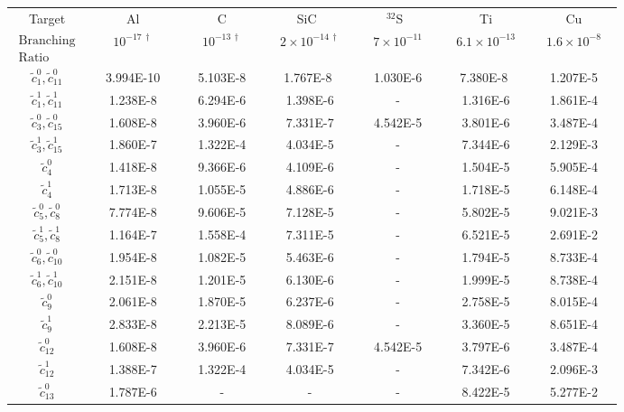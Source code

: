 \documentclass{book}[letterpaper,12pt]
\begin{document}
\begin{table}
\centering
{\renewcommand{\arraystretch}{1.5}
\begin{tabular}{ccccccc}
\hline
\hline
Target  &~~~~Al~~~~&~~~~C~~~~&~~~SiC~~~~&~~~$^{32}$S~~~~&~~~~Ti~~~~&~~~~Cu~~~~ \\[1.6pt]
$\begin{array}{l} \mathrm{Branching} \\  \mathrm{Ratio} \end{array}$ & $10^{-17 \, \dagger}$ & $10^{-13 \, \dagger}$ & $2 \times 10^{-14 \, \dagger}$ & $7 \times 10^{-11}$ &  $6.1 \times 10^{-13}$ & $1.6 \times 10^{-8}$  \\
\hline
$\tilde{c}_1^0,\tilde{c}_{11}^0$ &~~3.994E-10~~ & ~~5.103E-8~~ & ~~1.767E-8 ~~& ~~1.030E-6~~ & ~~7.380E-8 ~~& ~~1.207E-5~~ \\
$\tilde{c}_1^1,\tilde{c}_{11}^1$ &1.238E-8 & 6.294E-6 & 1.398E-6 & - & 1.316E-6 & 1.861E-4 \\
$\tilde{c}_3^0,\tilde{c}_{15}^0$ &1.608E-8 & 3.960E-6 &7.331E-7 & 4.542E-5 & 3.801E-6 & 3.487E-4 \\
$\tilde{c}_3^1,\tilde{c}_{15}^1$ &1.860E-7 & 1.322E-4 & 4.034E-5 & - & 7.344E-6 & 2.129E-3 \\
$\tilde{c}_4^0$ & 1.418E-8 & 9.366E-6 & 4.109E-6 & - & 1.504E-5 & 5.905E-4 \\
$\tilde{c}_4^1$ & 1.713E-8 & 1.055E-5 & 4.886E-6 & - & 1.718E-5 & 6.148E-4 \\
$\tilde{c}_5^0,\tilde{c}_8^0$ &7.774E-8 & 9.606E-5 & 7.128E-5 & - & 5.802E-5 & 9.021E-3 \\
$\tilde{c}_5^1,\tilde{c}_8^1$ &1.164E-7 & 1.558E-4 & 7.311E-5 & - & 6.521E-5 & 2.691E-2 \\
$\tilde{c}_6^0,\tilde{c}_{10}^0$ & 1.954E-8 & 1.082E-5 & 5.463E-6 & - & 1.794E-5 & 8.733E-4 \\
$\tilde{c}_6^1,\tilde{c}_{10}^1$ & 2.151E-8 & 1.201E-5 & 6.130E-6 & - & 1.999E-5 & 8.738E-4 \\
$\tilde{c}_9^0$ & 2.061E-8 & 1.870E-5 & 6.237E-6 & - & 2.758E-5 & 8.015E-4 \\
$\tilde{c}_9^1$ & 2.833E-8 & 2.213E-5 & 8.089E-6 & - & 3.360E-5 & 8.651E-4 \\
$\tilde{c}_{12}^0$ & 1.608E-8 & 3.960E-6 & 7.331E-7 & 4.542E-5 & 3.797E-6 & 3.487E-4 \\
$\tilde{c}_{12}^1$ & 1.388E-7 & 1.322E-4 & 4.034E-5 & - & 7.342E-6 & 2.096E-3 \\
$\tilde{c}_{13}^0$ & 1.787E-6 & - & - & - & 8.422E-5 & 5.277E-2 \\

\end{tabular}}
\end{table}
\end{document}
